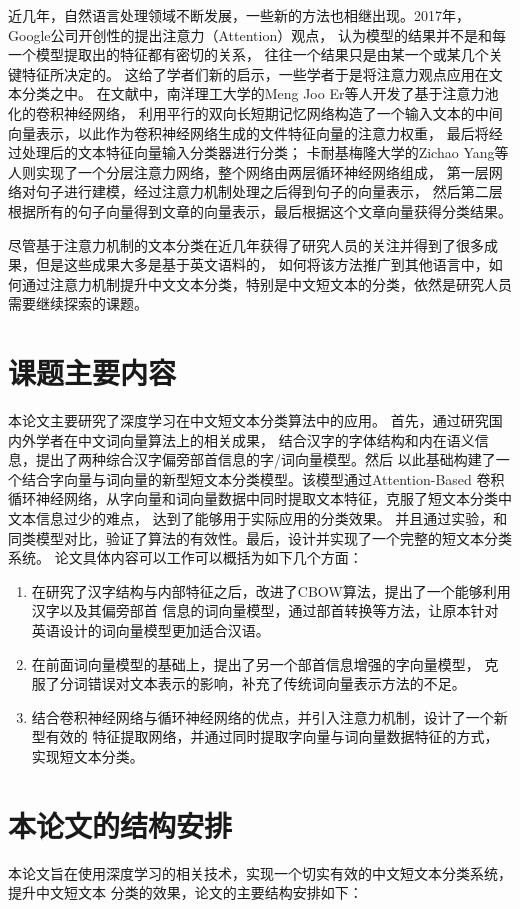 \documentclass{standalone}
\begin{document}
近几年，自然语言处理领域不断发展，一些新的方法也相继出现。2017年，
Google公司开创性的提出注意力（Attention）观点，
认为模型的结果并不是和每一个模型提取出的特征都有密切的关系，
往往一个结果只是由某一个或某几个关键特征所决定的。
这给了学者们新的启示，一些学者于是将注意力观点应用在文本分类之中。
在文献\cite{er2016attention}中，南洋理工大学的Meng Joo Er等人开发了基于注意力池化的卷积神经网络，
利用平行的双向长短期记忆网络构造了一个输入文本的中间向量表示，以此作为卷积神经网络生成的文件特征向量的注意力权重，
最后将经过处理后的文本特征向量输入分类器进行分类；
卡耐基梅隆大学的Zichao Yang等人则实现了一个分层注意力网络，整个网络由两层循环神经网络组成，
第一层网络对句子进行建模，经过注意力机制处理之后得到句子的向量表示，
然后第二层根据所有的句子向量得到文章的向量表示，最后根据这个文章向量获得分类结果。

尽管基于注意力机制的文本分类在近几年获得了研究人员的关注并得到了很多成果，但是这些成果大多是基于英文语料的，
如何将该方法推广到其他语言中，如何通过注意力机制提升中文文本分类，特别是中文短文本的分类，依然是研究人员需要继续探索的课题。
\section{课题主要内容}
本论文主要研究了深度学习在中文短文本分类算法中的应用。
首先，通过研究国内外学者在中文词向量算法上的相关成果，
结合汉字的字体结构和内在语义信息，提出了两种综合汉字偏旁部首信息的字/词向量模型。然后
以此基础构建了一个结合字向量与词向量的新型短文本分类模型。该模型通过Attention-Based
卷积循环神经网络，从字向量和词向量数据中同时提取文本特征，克服了短文本分类中文本信息过少的难点，
达到了能够用于实际应用的分类效果。
并且通过实验，和同类模型对比，验证了算法的有效性。最后，设计并实现了一个完整的短文本分类系统。
论文具体内容可以工作可以概括为如下几个方面：
\begin{enumerate}
    \item 在研究了汉字结构与内部特征之后，改进了CBOW算法，提出了一个能够利用汉字以及其偏旁部首
    信息的词向量模型，通过部首转换等方法，让原本针对英语设计的词向量模型更加适合汉语。
    \item 在前面词向量模型的基础上，提出了另一个部首信息增强的字向量模型，
    克服了分词错误对文本表示的影响，补充了传统词向量表示方法的不足。
    \item 结合卷积神经网络与循环神经网络的优点，并引入注意力机制，设计了一个新型有效的
    特征提取网络，并通过同时提取字向量与词向量数据特征的方式，实现短文本分类。
\end{enumerate}
\section{本论文的结构安排}
本论文旨在使用深度学习的相关技术，实现一个切实有效的中文短文本分类系统，提升中文短文本
分类的效果，论文的主要结构安排如下：
\end{document}
